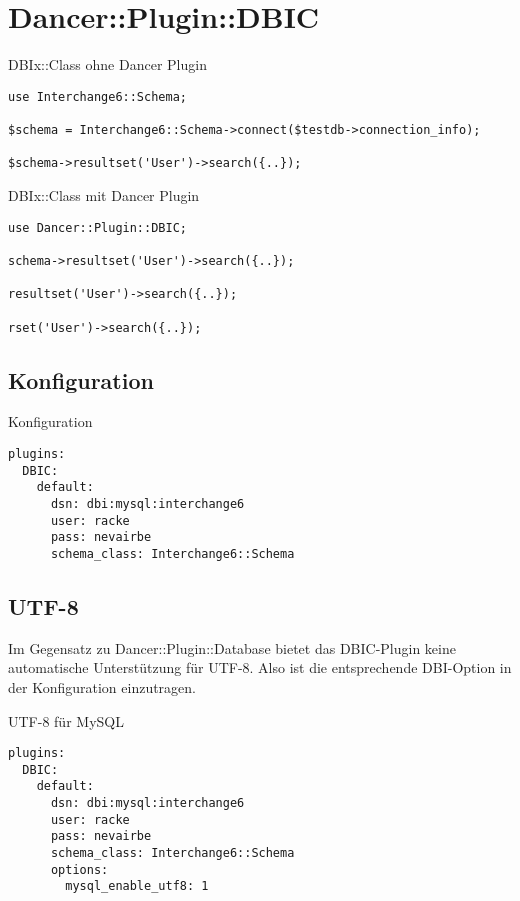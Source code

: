 \section{Dancer::Plugin::DBIC}
\begin{frame}[fragile]{DBIx::Class ohne Dancer Plugin}
\begin{lstlisting}
use Interchange6::Schema;

$schema = Interchange6::Schema->connect($testdb->connection_info);

$schema->resultset('User')->search({..});
\end{lstlisting}
\end{frame}

\begin{frame}[fragile]{DBIx::Class mit Dancer Plugin}
\begin{lstlisting}
use Dancer::Plugin::DBIC;

schema->resultset('User')->search({..});

resultset('User')->search({..});

rset('User')->search({..});
\end{lstlisting}
\end{frame}

\subsection{Konfiguration}
\begin{frame}[fragile]{Konfiguration}
\begin{lstlisting}
plugins:
  DBIC:
    default:
      dsn: dbi:mysql:interchange6
      user: racke
      pass: nevairbe
      schema_class: Interchange6::Schema
\end{lstlisting}
\end{frame}

\subsection{UTF-8}
Im Gegensatz zu Dancer::Plugin::Database bietet das DBIC-Plugin
keine automatische Unterstützung für UTF-8. Also ist die entsprechende
DBI-Option in der Konfiguration einzutragen.
\begin{frame}[fragile]{UTF-8 für MySQL}
\begin{lstlisting}
plugins:
  DBIC:
    default:
      dsn: dbi:mysql:interchange6
      user: racke
      pass: nevairbe
      schema_class: Interchange6::Schema
      options:
        mysql_enable_utf8: 1
\end{lstlisting}
\end{frame}

